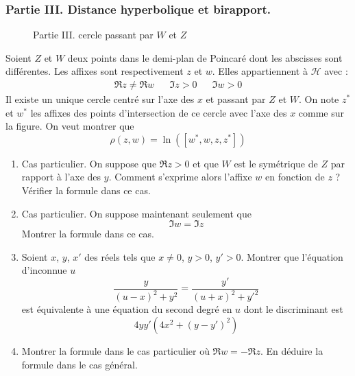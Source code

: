 \subsubsection*{Partie III. Distance hyperbolique et birapport.}
\begin{figure}[ht]
 \centering

\caption{Partie III. cercle passant par $W$ et $Z$}
\label{fig:Edishyp_1}
\end{figure}
Soient $Z$ et $W$ deux points dans le demi-plan de Poincaré dont les abscisses sont différentes. Les affixes sont respectivement $z$ et $w$. Elles appartiennent à $\mathcal H$  avec :
\begin{align*}
 \Re z \neq \Re w & & \Im z >0 & & \Im w >0
\end{align*}
Il existe un unique cercle centré sur l'axe des $x$ et passant par $Z$ et $W$. On note $z^*$ et $w^*$ les affixes des points d'intersection de ce cercle avec l'axe des $x$ comme sur la figure.\newline
On veut montrer que
\begin{displaymath}
 \rho(z,w) = \ln ([w^*,w,z,z^*])
\end{displaymath}
\begin{enumerate}
 \item Cas particulier. On suppose que $\Re z >0$ et que $W$ est le symétrique de $Z$ par rapport à l'axe des $y$. Comment s'exprime alors l'affixe $w$ en fonction de $z$ ? Vérifier la formule dans ce cas.
\item Cas particulier. On suppose maintenant seulement que
\begin{displaymath}
 \Im w = \Im z
\end{displaymath}
Montrer la formule dans ce cas.
\item Soient $x$, $y$, $x'$ des réels tels que $x\neq 0$, $y>0$, $y'>0$.\newline
Montrer que l'équation d'inconnue $u$
\begin{displaymath}
 \dfrac{y}{(u-x)^2+y^2} = \dfrac{y'}{(u+x)^2+y'^2}
\end{displaymath}
est équivalente à une équation du second degré en $u$ dont le discriminant est
\begin{displaymath}
 4yy'(4x^2+(y-y')^2)
\end{displaymath}
\item Montrer la formule dans le cas particulier où $\Re w = - \Re z$. En déduire la formule dans le cas général.
\end{enumerate}
